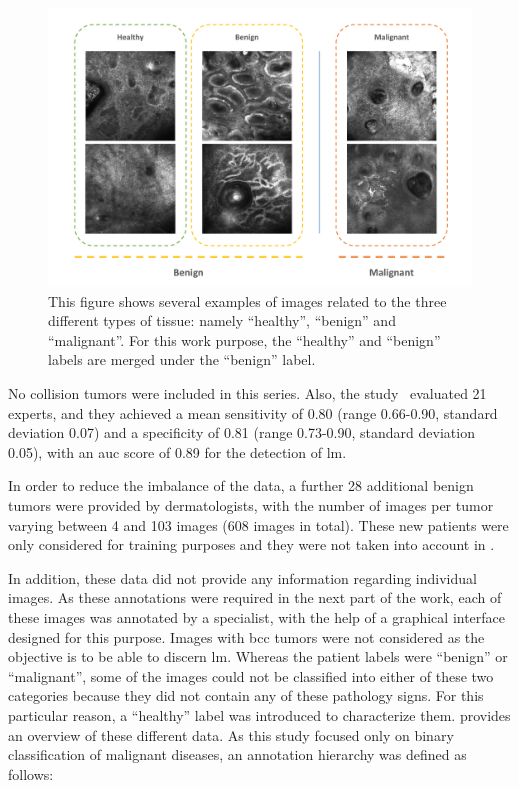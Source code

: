 \documentclass[journal,article,accept,moreauthors,pdftex, applsci]{Definitions/mdpi}
\begin{document}
\begin{figure}[H]
    \begin{center}
        \includegraphics[width=\linewidth]{Figures/Data.pdf}
        \caption{This figure shows several examples of images related to the three different types of tissue: namely “healthy”, “benign” and “malignant”. For this work purpose, the “healthy” and “benign” labels are merged under the “benign” label.}
        \label{fig:data}
    \end{center} 
\end{figure}\par
\newpage
No collision tumors were included in this series. Also, the study~\cite{Cinotti2018} evaluated 21 experts, and they achieved a mean sensitivity of 0.80 (range 0.66-0.90, standard deviation 0.07) and a specificity of 0.81 (range 0.73-0.90, standard deviation 0.05), with an \ac{auc} score of 0.89 for the detection of \ac{lm}.\par
In order to reduce the imbalance of the data, a further 28 additional benign tumors were provided by dermatologists, with the number of images per tumor varying between 4 and 103 images (608 images in total). These new patients were only considered for training purposes and they were not taken into account in .\par
In addition, these data did not provide any information regarding individual images. As these annotations were required in the next part of the work, each of these images was annotated by a specialist, with the help of a graphical interface designed for this purpose. Images with \ac{bcc} tumors were not considered as the objective is to be able to discern \ac{lm}. Whereas the patient labels were “benign” or “malignant”, some of the images could not be classified into either of these two categories because they did not contain any of these pathology signs. For this particular reason, a “healthy” label was introduced to characterize them.  provides an overview of these different data. As this study focused only on binary classification of malignant diseases, an annotation hierarchy was defined as follows:
\end{document}
